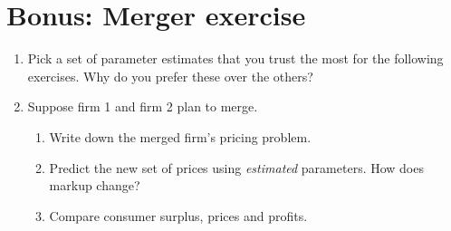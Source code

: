 \documentclass[12pt ]{article}
\begin{document}
\section{Bonus: Merger exercise}

\begin{enumerate}
\item Pick a set of parameter estimates that you trust the most for
  the following exercises. Why do you prefer these over the others?
\item Suppose firm 1 and firm 2 plan to merge.
  \begin{enumerate}
  \item Write down the merged firm's pricing problem.
  \item Predict the new set of prices using \emph{estimated}
    parameters. How does markup change?
  \item Compare consumer surplus, prices and profits.
  \end{enumerate}
\end{enumerate}


\end{document}
